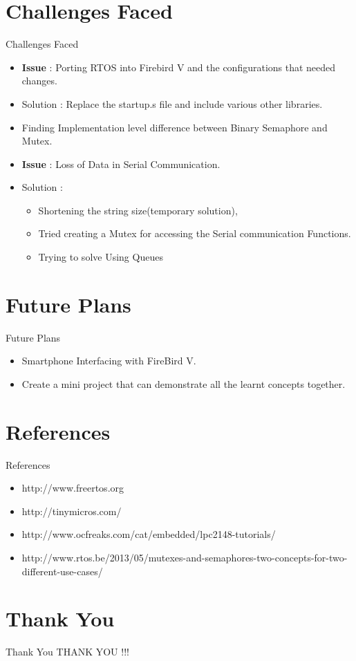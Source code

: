 \documentclass[10pt, a4paper]{beamer}
\begin{document}
\section{Challenges Faced}
\begin{frame}{Challenges Faced}
    \begin{itemize}
        \item \textbf{Issue} : Porting RTOS into Firebird V and the configurations that needed changes.
        \item Solution : Replace the startup.s file and include various other libraries.
        
        \item Finding Implementation level difference between Binary Semaphore and Mutex.
        
        \item \textbf{Issue} : Loss of Data in Serial Communication.
        \item Solution :
        
        \begin{itemize}
        \item Shortening the string size(temporary solution),
        \item Tried creating a Mutex for accessing the Serial communication Functions.
        \item Trying to solve Using Queues
        \end{itemize}
        
    \end{itemize}
\end{frame}
\section{Future Plans}
\begin{frame}{Future Plans}
    \begin{itemize}
        
        \item Smartphone Interfacing with FireBird V.
        \item Create a mini project that can demonstrate all the learnt concepts together.  
        
    \end{itemize}
\end{frame}

\section{References}
\begin{frame}{References}
    \begin{itemize}
        \item http://www.freertos.org
        \item http://tinymicros.com/
        \item http://www.ocfreaks.com/cat/embedded/lpc2148-tutorials/
        \item http://www.rtos.be/2013/05/mutexes-and-semaphores-two-concepts-for-two-different-use-cases/
    \end{itemize}
\end{frame}

\section{Thank You}
\begin{frame}{Thank You}
    \centering THANK YOU !!!
\end{frame}
\end{document}

